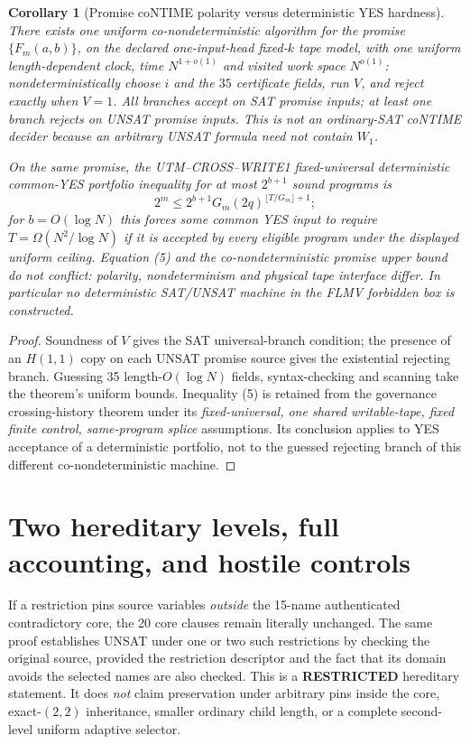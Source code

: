 \documentclass[11pt]{article}
\newtheorem{corollary}[theorem]{Corollary}
\begin{document}
\begin{corollary}[Promise coNTIME polarity versus deterministic YES hardness]\label{cor:polarity}
There exists one uniform co-nondeterministic algorithm for the \emph{promise} $\{F_m(a,b)\}$, on the declared one-input-head fixed-$k$ tape model, with one uniform length-dependent clock, time $N^{1+o(1)}$ and visited work space $N^{o(1)}$: nondeterministically choose $i$ and the $35$ certificate fields, run $V$, and \emph{reject} exactly when $V=1$. All branches accept on SAT promise inputs; at least one branch rejects on UNSAT promise inputs. This is \emph{not} an ordinary-SAT coNTIME decider because an arbitrary UNSAT formula need not contain $W_1$.

On the same promise, the UTM--CROSS--WRITE1 fixed-universal \emph{deterministic} common-YES portfolio inequality for at most $2^{b+1}$ sound programs is
\[
2^m\le2^{b+1}G_m(2q)^{\lfloor T/G_m\rfloor+1};\tag{5}
\]
for $b=O(\log N)$ this forces some common YES input to require $T=\Omega(N^2/\log N)$ if it is accepted by every eligible program under the displayed uniform ceiling. Equation (5) and the co-nondeterministic promise upper bound do not conflict: \emph{polarity, nondeterminism and physical tape interface differ}. In particular no deterministic SAT/UNSAT machine in the FLMV forbidden box is constructed.
\end{corollary}
\begin{proof}
Soundness of $V$ gives the SAT universal-branch condition; the presence of an $H(1,1)$ copy on each UNSAT promise source gives the existential rejecting branch. Guessing 35 length-$O(\log N)$ fields, syntax-checking and scanning take the theorem's uniform bounds. Inequality (5) is retained from the governance crossing-history theorem under its \emph{fixed-universal, one shared writable-tape, fixed finite control, same-program splice} assumptions. Its conclusion applies to YES acceptance of a deterministic portfolio, not to the guessed rejecting branch of this different co-nondeterministic machine.\end{proof}

\section{Two hereditary levels, full accounting, and hostile controls}
If a restriction pins source variables \emph{outside} the 15-name authenticated contradictory core, the 20 core clauses remain literally unchanged. The same proof establishes UNSAT under one or two such restrictions by checking the original source, provided the restriction descriptor and the fact that its domain avoids the selected names are also checked. This is a \textbf{RESTRICTED} hereditary statement. It does \emph{not} claim preservation under arbitrary pins inside the core, exact-$(2,2)$ inheritance, smaller ordinary child length, or a complete second-level uniform adaptive selector.
\end{document}
